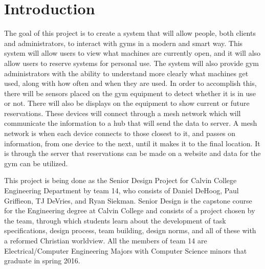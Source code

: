 \documentclass[ppfs.tex]{template/subfiles}
\begin{document}
\section{Introduction}

The goal of this project is to create a system that will allow people, both clients and administrators, to interact with gyms in a modern and smart way. This system will allow users to view what machines are currently open, and it will also allow users to reserve systems for personal use. The system will also provide gym administrators with the ability to understand more clearly what machines get used, along with how often and when they are used. In order to accomplish this, there will be sensors placed on the gym equipment to detect whether it is in use or not. There will also be displays on the equipment to show current or future reservations. These devices will connect through a mesh network which will communicate the information to a hub that will send the data to server. A mesh network is when each device connects to those closest to it, and passes on information, from one device to the next, until it makes it to the final location. It is through the server that reservations can be made on a website and data for the gym can be utilized. 

This project is being done as the Senior Design Project for Calvin College Engineering Department by team 14, who consists of Daniel DeHoog, Paul Griffieon, TJ DeVries, and Ryan Siekman. Senior Design is the capstone course for the Engineering degree at Calvin College and consists of a project chosen by the team, through which students learn about the development of task specifications, design process, team building, design norms, and all of these with a reformed Christian worldview. All the members of team 14 are Electrical/Computer Engineering Majors with Computer Science minors that graduate in spring 2016. 
\end{document}
